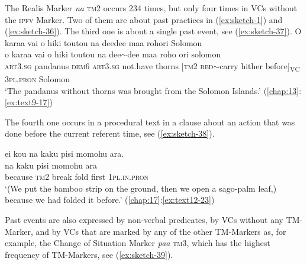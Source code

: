 \documentclass[output=paper]{langscibook}
\begin{document}
The Realis Marker \textit{na} \textsc{tm}2 occurs 234 times, but only four times in VCs  without the \textsc{ipfv} Marker. Two of them are about past practices in (\ref{ex:sketch-1}) and (\ref{ex:sketch-36}). The third one is about a single past event, see (\ref{ex:sketch-37}).
\newpage
\ea\label{ex:sketch-37}
    O karaa vai o hiki toutou na deedee maa rohori Solomon\\
    \gll o	karaa	vai	o	hiki	toutou	na	dee{$\sim$}dee	maa	roho	ori	solomon\\
     \textsc{art}3.\textsc{sg}	pandanus	\textsc{dem}6	\textsc{art}3.\textsc{sg}	not.have	thorns	[\textsc{tm}2	\textsc{red}{$\sim$}carry	hither	before]\textsubscript{VC}	3\textsc{pl}.\textsc{pron}	Solomon\\
    \glt `The pandanus without thorns was brought from the Solomon Islands.' (\ref{chap:13}:\ref{ex:text9-17})
\z

\newpage
The fourth one occurs in a procedural text in a clause about an action that was done before the current referent time, see (\ref{ex:sketch-38}).

\ea\label{ex:sketch-38}
    ei kou na kaku pisi momohu ara.\\
     na kaku pisi momohu ara\\
    because \textsc{tm}2 break fold first	1\textsc{pl}.\textsc{in}.\textsc{pron}\\
    \glt `(We put the bamboo strip on the ground, then we open a sago-palm leaf,) because we had folded it before.' (\ref{chap:17}:\ref{ex:text12-23})
\z

Past events are also expressed by non-verbal predicates, by VCs without any TM-Marker, and by VCs that are marked by any of the other TM-Markers as, for example, the Change of Situation Marker \textit{paa} \textsc{tm}3, which has the highest frequency of TM-Markers, see (\ref{ex:sketch-39}).
\end{document}
